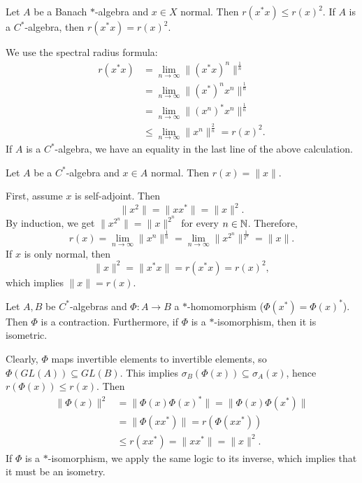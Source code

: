 \begin{corollary}
  Let $A$ be a Banach $*$-algebra and $x \in X$ normal.
  Then $r(x^* x) \leq r(x)^2$. If $A$ is a $C^*$-algebra, then $r(x^* x) = r(x)^2$.
\end{corollary}

\begin{myproof}
  We use the spectral radius formula:
  \begin{align*}
    r(x^* x) &= \lim_{n \to \infty} \| (x^* x)^n \|^{\frac{1}{n}}\\
    &= \lim_{n \to \infty} \| (x^*)^n x^n\|^{\frac{1}{n}}\\
    &= \lim_{n \to \infty} \| (x^n)^* x^n\|^{\frac{1}{n}}\\
    &\leq \lim_{n \to \infty} \| x^n\|^{\frac{2}{n}} = r(x)^2.
  \end{align*} 
  If $A$ is a $C^*$-algebra, we have an equality in the last line of the above calculation.
\end{myproof}

\begin{proposition}
  Let $A$ be a $C^*$-algebra and $x \in A$ normal. Then $r(x) = \|x\|$.
\end{proposition}

\begin{myproof}
  First, assume $x$ is self-adjoint. Then 
  $$\|x^2\| = \| xx^*\| = \|x\|^2.$$
  By induction, we get 
  $\|x^{2^n}\| = \|x\|^{2^n}$ for every $n \in \mathbb {N}$.
  Therefore, 
  $$r(x) = \lim_{n \to \infty} \| x^n\|^\frac{1}{n} = \lim_{n \to \infty} \| x^{2^n} \|^{\frac{1}{2^n}} = \| x\|.$$
  If $x$ is only normal, then $$\| x\|^2 = \| x^*x\| = r(x^* x) = r(x)^2,$$
  which implies $\|x\| = r(x)$.
\end{myproof}

\begin{corollary}\label{cor:2}
  Let $A, B$ be $C^*$-algebras and $\Phi: A \to B$ a $*$-homomorphism ($\Phi(x^*) = \Phi(x)^*$).
  Then $\Phi$ is a contraction. Furthermore, if $\Phi$ is a $*$-isomorphism,
  then it is isometric.
\end{corollary}

\begin{myproof}
  Clearly, $\Phi$ maps invertible elements to invertible elements,
  so $\Phi (GL (A)) \subseteq GL (B)$. This implies $\sigma_B (\Phi(x)) \subseteq \sigma_A (x)$,
  hence $r(\Phi(x)) \leq r(x)$. Then 
  \begin{align*}
    \| \Phi(x)\|^2 &= \| \Phi(x) \Phi(x)^*\| = \| \Phi(x) \Phi(x^*)\|\\
    &= \|\Phi(x x^*)\| = r(\Phi(x x^*))\\
    &\leq r(x x^*) = \| x x^*\| = \|x\|^2.
  \end{align*}
  If $\Phi$ is a $*$-isomorphism, we apply the same logic to its inverse, which implies that it must be an isometry.
\end{myproof}

